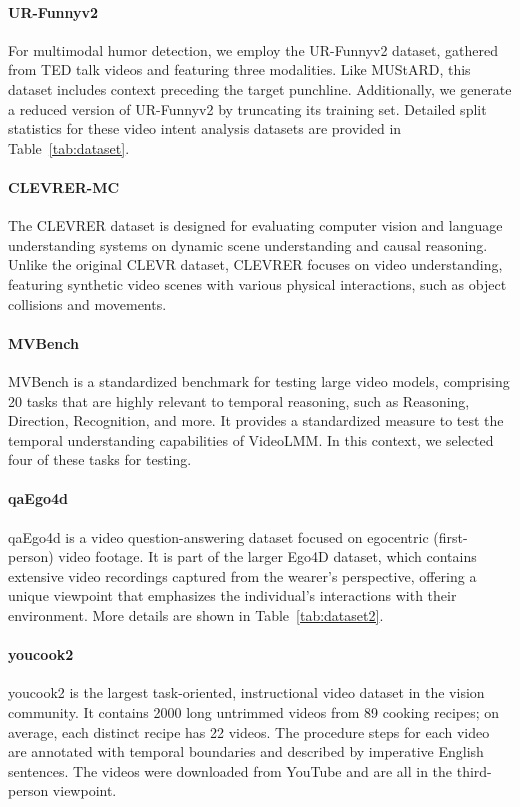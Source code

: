 \paragraph{UR-Funnyv2\cite{hasan2019ur}} For multimodal humor detection, we employ the UR-Funnyv2 dataset, gathered from TED talk videos and featuring three modalities. Like MUStARD, this dataset includes context preceding the target punchline. Additionally, we generate a reduced version of UR-Funnyv2 by truncating its training set. Detailed split statistics for these video intent analysis datasets are provided in Table~\ref{tab:dataset}.



\paragraph{CLEVRER-MC\cite{yi2019clevrer}} The CLEVRER dataset is designed for evaluating computer vision and language understanding systems on dynamic scene understanding and causal reasoning. Unlike the original CLEVR dataset, CLEVRER focuses on video understanding, featuring synthetic video scenes with various physical interactions, such as object collisions and movements. 

\paragraph{MVBench\cite{li2023mvbench}}  MVBench is a standardized benchmark for testing large video models, comprising 20 tasks that are highly relevant to temporal reasoning, such as Reasoning, Direction, Recognition, and more. It provides a standardized measure to test the temporal understanding capabilities of VideoLMM. In this context, we selected four of these tasks for testing.

\paragraph{qaEgo4d\cite{barmann2022did}} qaEgo4d is a video question-answering dataset focused on egocentric (first-person) video footage. It is part of the larger Ego4D dataset, which contains extensive video recordings captured from the wearer's perspective, offering a unique viewpoint that emphasizes the individual's interactions with their environment. More details are shown in Table~\ref{tab:dataset2}.

\paragraph{youcook2\cite{zhou2018towards} }youcook2 is the largest task-oriented, instructional video dataset in the vision community. It contains 2000 long untrimmed videos from 89 cooking recipes; on average, each distinct recipe has 22 videos. The procedure steps for each video are annotated with temporal boundaries and described by imperative English sentences. The videos were downloaded from YouTube and are all in the third-person viewpoint.

